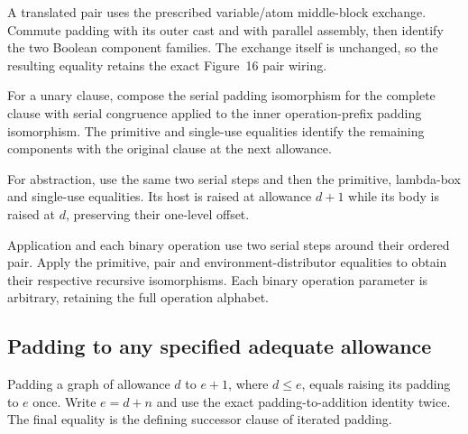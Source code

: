 A translated pair uses the prescribed variable/atom middle-block exchange.
Commute padding with its outer cast and with parallel assembly, then identify
the two Boolean component families. The exchange itself is unchanged, so
the resulting equality retains the exact Figure~16 pair wiring.





For a unary clause, compose the serial padding isomorphism for the complete
clause with serial congruence applied to the inner operation-prefix padding
isomorphism. The primitive and single-use equalities identify the remaining
components with the original clause at the next allowance.

For abstraction, use the same two serial steps and then the primitive,
lambda-box and single-use equalities. Its host is raised at allowance $d+1$
while its body is raised at $d$, preserving their one-level offset.

Application and each binary operation use two serial steps around their
ordered pair. Apply the primitive, pair and environment-distributor equalities
to obtain their respective recursive isomorphisms. Each binary operation
parameter is arbitrary, retaining the full operation alphabet.






\subsection{Padding to any specified adequate allowance}

Padding a graph of allowance $d$ to $e+1$, where $d\leq e$, equals raising
its padding to $e$ once. Write $e=d+n$ and use the exact padding-to-addition
identity twice. The final equality is the defining successor clause of
iterated padding.



